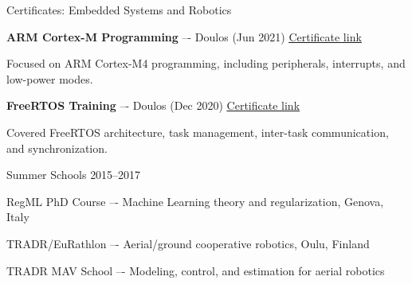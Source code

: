 
\begin{cventries}

  \cventry
  {Certificates: Embedded Systems and Robotics} %
  {} %
  {} %
  {} %
  {
    \begin{cvitems}
    \item {\textbf{ARM Cortex-M Programming} –- Doulos (Jun 2021) \underline{\href{https://shorturl.at/opCKZ}{Certificate link}}}
      \begin{cvparagraph}
        Focused on ARM Cortex-M4 programming, including peripherals, interrupts, and low-power modes.
      \end{cvparagraph}
    \item {\textbf{FreeRTOS Training} –- Doulos (Dec 2020) \underline{\href{https://bit.ly/3ppdcOF}{Certificate link}}}
      \begin{cvparagraph}
        Covered FreeRTOS architecture, task management, inter-task communication, and synchronization.
      \end{cvparagraph}
    \end{cvitems}
  }

  \cventry
  {Summer Schools} %
  {} %
  {} %
  {2015--2017} %
  {
    \begin{cvitems}
    \item {RegML PhD Course –- Machine Learning theory and regularization, Genova, Italy}
    \item {TRADR/EuRathlon –- Aerial/ground cooperative robotics, Oulu, Finland}
    \item {TRADR MAV School –- Modeling, control, and estimation for aerial robotics}
    \end{cvitems}
  }

\end{cventries}
